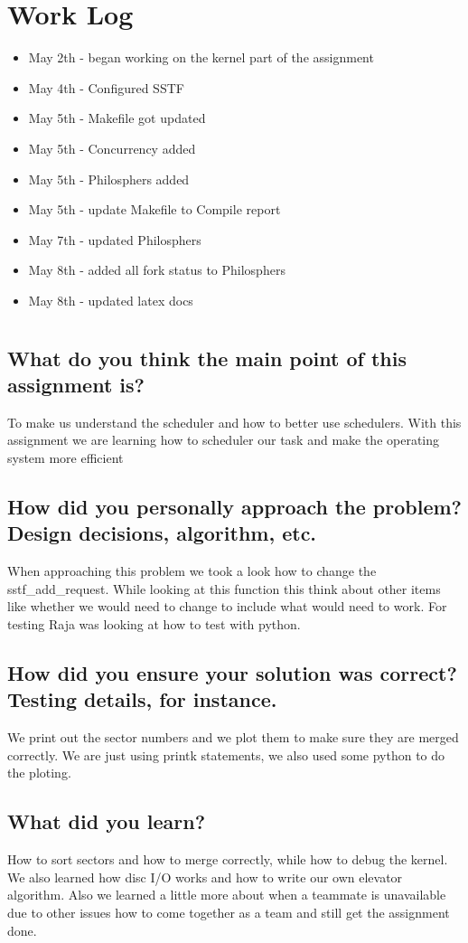 \documentclass[draftclsnofoot,onecolumn,10pt,compsoc]{IEEEtran}
\begin{document}
\section{Work Log}
\begin{itemize}
	\item May 2th - began working on the kernel part of the assignment
	\item May 4th - Configured SSTF
	\item May 5th - Makefile got updated
	\item May 5th -  Concurrency added
	\item May 5th - Philosphers added
	\item May 5th - update Makefile to Compile report
	\item May 7th - updated Philosphers 
	\item May 8th - added all fork status to Philosphers
	\item May 8th - updated latex docs
	
	
	
	
\end{itemize}
\section{}
\subsection{What do you think the main point of this assignment is?}
To make us understand the scheduler and how to better use schedulers.  With this assignment we are learning how to scheduler our task and make the operating system more efficient 
\subsection{How did you personally approach the problem? Design decisions, algorithm, etc.}
When approaching this problem we took a look how to change the sstf\_add\_request.  While looking at this function this think about other items like whether we would need to change to include what would need to work.  For testing Raja was looking at how to test with python.
\subsection{How did you ensure your solution was correct? Testing details, for instance.}
We print out the sector numbers and we plot them to make sure they are merged correctly.  
We are just using printk statements, we also used some python to do the ploting. 

\subsection{What did you learn?}
How to sort sectors and how to merge correctly, while how to debug the kernel. We also learned how disc I/O works and how to write our own elevator algorithm. Also we learned a little more about when a teammate is unavailable due to other issues how to come together as a team and still get the assignment done. 
\end{document}
